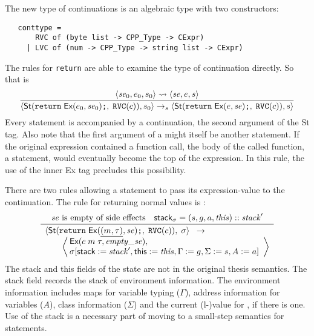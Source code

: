 \documentclass[11pt]{article}
\begin{document}
The new type of continuations is an algebraic type with two
constructors:
\begin{verbatim}
   conttype =
       RVC of (byte list -> CPP_Type -> CExpr)
     | LVC of (num -> CPP_Type -> string list -> CExpr)
\end{verbatim}
The rules for \texttt{return} are able to examine the type of
continuation directly.  So that  is
\[
\infer{\statebrack{\textsf{St}(\ckey{return}\;\textsf{Ex}(e_0,\mathit{se}_0)\ckey{;},\;\ckey{RVC}(c)),s_0}\stmtarrow
  \statebrack{\textsf{St}(\ckey{return}\;\textsf{Ex}(e,\mathit{se})\ckey{;},\;\ckey{RVC}(c)),s}}{
  \statebrack{\mathit{se}_0,e_0,s_0}\lvtorv\statebrack{\mathit{se},e,s}}
\]
Every statement is accompanied by a continuation, the second argument
of the \textsf{St} tag. Also note that the first argument of a
 might itself be another statement.  If the original
expression contained a function call, the body of the called function,
a statement, would eventually become the top of the expression.  In
this rule, the use of the inner \textsf{Ex} tag precludes this
possibility.

There are two rules allowing a  statement to pass its
expression-value to the continuation.  The rule for returning normal
values is :
\[
\infer{%
  \begin{array}[t]{l}
    \statebrack{\textsf{St}(\ckey{return}\;\textsf{Ex}(\cvalue{m}{\tau},\mathit{se})\ckey{;},\;\ckey{RVC}(c)),
      \;\sigma}%
    \;\;\rightarrow\\
    \qquad\left\langle\!\!\begin{array}{l}
      \textsf{Ex}(c\;m\;\tau,\mathit{empty\_se}),\\
      \sigma[\textsf{stack} := \mathit{stack}', \textsf{this} :=
      \mathit{this}, \Gamma := g, \Sigma := s, A
      := a]\end{array}\right\rangle
  \end{array}}{
  \mathit{se}\mbox{ is empty of side effects} & \textsf{stack}_\sigma = (s,g,a,\mathit{this})
  :: \mathit{stack}'}
\]
The \textsf{stack} and \textsf{this} fields of the state are not in
the original thesis semantics.  The \textsf{stack} field records the
stack of environment information.  The environment information
includes maps for variable typing ($\Gamma$), address information for
variables ($A$), class information ($\Sigma$) and the current
(l-)value for , if there is one.   Use of the
\textsf{stack} is a necessary part of moving to a small-step semantics
for statements.
\end{document}
